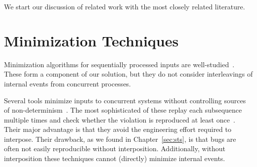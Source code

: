 %



We start our discussion of related work with the most closely
related literature.

\section{Minimization Techniques}

 Minimization
algorithms for sequentially processed inputs are
well-studied~\cite{Zeller:2002:SIF:506201.506206,claessen2000quickcheck,regehr2012test,whitaker2004configuration,burger2011minimizing,fse_web_ddmin,chang2007simulation}.
These form a component of our solution, but they do not consider
interleavings of internal events from concurrent processes.

 Several
tools minimize inputs to concurrent
systems without controlling sources of non-determinism~\cite{arts2006testing,clause2007technique,tucek2007triage,jin2013f3,hughes2011testing}.
The most sophisticated of these replay each subsequence
multiple times and check whether the violation is reproduced at least once~\cite{hughes2011testing,claessen2009finding}.
Their major advantage is that they avoid the engineering effort required to
interpose. Their drawback, as we found in Chapter~\ref{sec:sts},
 is that bugs are often not easily reproducible without
interposition. Additionally, without interposition these techniques cannot
(directly) minimize internal events.

